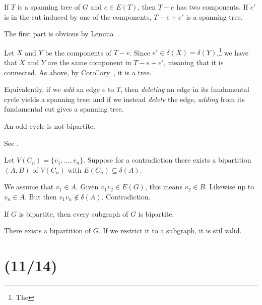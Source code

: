 \documentclass[class=math239,notes,tikz]{agony}
\begin{document}
\begin{theorem}[5.2.4]
  If $T$ is a spanning tree of $G$ and $e \in E(T)$,
  then $T-e$ has two components.
  If $e'$ is in the cut induced by one of the components,
  $T-e+e'$ is a spanning tree.
\end{theorem}
\begin{prf}
  The first part is obvious by Lemma~.

  Let $X$ and $Y$ be the components of $T-e$.
  Since $e' \in \delta(X) = \delta(Y)$,\footnote{The }
  we have that $X$ and $Y$ are the same component
  in $T-e+e'$, meaning that it is connected.
  As above, by Corollary~, it is a tree.
\end{prf}

Equivalently, if we \emph{add} an edge $e$ to $T$,
then \emph{deleting} an edge in its fundamental cycle yields a spanning tree;
and if we instead \emph{delete} the edge,
\emph{adding} from its fundamental cut gives a spanning tree.

\begin{lemma}[5.3.1]\label{lem:oddbi}
  An odd cycle is not bipartite.
\end{lemma}
\begin{prf}
  See .

  Let $V(C_n) = \{v_1,\dotsc,v_n\}$.
  Suppose for a contradiction there exists a bipartition
  $(A,B)$ of $V(C_n)$ with $E(C_n) \subseteq \delta(A)$.

  We assume \Wlog that $v_1 \in A$.
  Given $v_1v_2 \in E(G)$, this means $v_2 \in B$.
  Likewise up to $v_n \in A$.
  But then $v_1v_n \not\in \delta(A)$.
  Contradiction.
\end{prf}

\begin{prop}
  If $G$ is bipartite, then every subgraph of $G$ is bipartite.
\end{prop}
\begin{prf}
  There exists a bipartition of $G$.
  If we restrict it to a subgraph, it is stil valid.
\end{prf}

\section{(11/14)}
\end{document}
